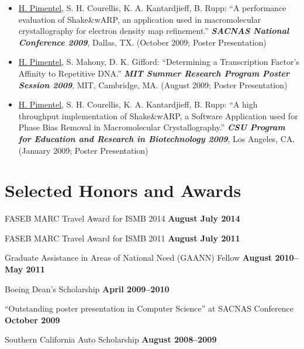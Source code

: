 \documentclass[11pt,notitlepage]{article} %
\begin{document}
\begin{itemize}
\item \underline{H. Pimentel}, S. H. Courellis, K. A. Kantardjieff, B. Rupp: ``A
performance evaluation of Shake\&wARP, an application used in macromolecular
crystallography for electron density map refinement.''  {\bf \emph{SACNAS
    National Conference 2009}}, Dallas, TX. (October 2009; Poster Presentation)

  \item \underline{H. Pimentel}, S. Mahony, D. K. Gifford: ``Determining a
Transcription Factor's Affinity to Repetitive DNA.'' {\bf \emph{MIT
    Summer Research Program Poster Session 2009}}, MIT, Cambridge,
MA. (August 2009; Poster Presentation)


\item \underline{H. Pimentel}, S. H. Courellis, K. A. Kantardjieff, B. Rupp:
``A high throughput implementation of Shake\&wARP, a Software
Application used for Phase Bias Removal in Macromolecular
Crystallography.'' {\bf \emph{CSU Program for Education and Research
   in Biotechnology 2009}}, Los Angeles, CA. (January 2009; Poster Presentation)
 \end{itemize}

  \bigskip
\section*{Selected Honors and Awards}
\medskip

FASEB MARC Travel Award for ISMB 2014 \hfill {\bf August
  July 2014}

\medskip
FASEB MARC Travel Award for ISMB 2011 \hfill {\bf August
  July 2011}

\medskip
Graduate Assistance in Areas of National Need (GAANN) Fellow \hfill {\bf August
  2010--May 2011}

\medskip
Boeing Dean's Scholarship \hfill {\bf April 2009--2010}

\medskip
``Outstanding poster presentation in Computer Science'' at SACNAS
Conference \hfill {\bf October 2009}

\medskip
Southern California Auto Scholarship \hfill {\bf August 2008--2009}
\end{document}

